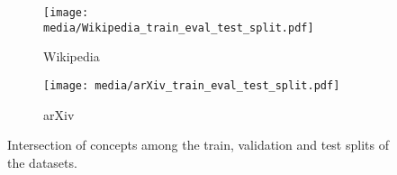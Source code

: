 \begin{wrapfigure}{r}{0.5\textwidth}
    \vspace{-3mm}
    \centering
    \begin{subfigure}[t]{0.5\linewidth}
        \centering
        \texttt{[image: media/Wikipedia\_train\_eval\_test\_split.pdf]}
        \caption{Wikipedia}
    \end{subfigure}%
    \begin{subfigure}[t]{0.4\linewidth}
        \centering
        \texttt{[image: media/arXiv\_train\_eval\_test\_split.pdf]}
        \caption{arXiv}
    \end{subfigure}
    \vspace*{-2mm}
    \caption{Intersection of concepts among the train, validation and test splits of the datasets.}
    \vspace*{-3mm}
    \label{fig:dataset-overlap}
\end{wrapfigure}
